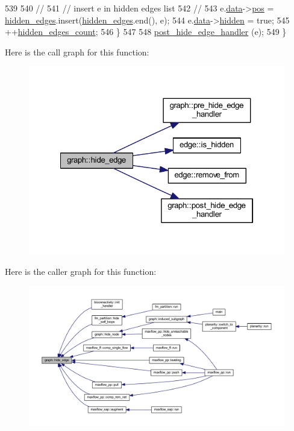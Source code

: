 \begin{DoxyCode}
539 
540     \textcolor{comment}{//}
541     \textcolor{comment}{// insert e in hidden edges list}
542     \textcolor{comment}{//}
543     e.\mbox{\hyperlink{classedge_a0ebb6dfa28b77f47529085049352b436}{data}}->\mbox{\hyperlink{classedge__data_a178a8fd40a6ec8139291f96a7807f711}{pos}} = \mbox{\hyperlink{classgraph_a0d3da33d047ba7cdc3dc68b5d9c84b88}{hidden\_edges}}.insert(\mbox{\hyperlink{classgraph_a0d3da33d047ba7cdc3dc68b5d9c84b88}{hidden\_edges}}.end(), e);
544     e.\mbox{\hyperlink{classedge_a0ebb6dfa28b77f47529085049352b436}{data}}->\mbox{\hyperlink{classedge__data_af8dc68051e5fe3336aa31ae1f3e104c3}{hidden}} = \textcolor{keyword}{true};
545     ++\mbox{\hyperlink{classgraph_a3151f544e049fbd985204ca9d8f74c97}{hidden\_edges\_count}};
546     \}
547 
548     \mbox{\hyperlink{classgraph_ad4614e74a125054eb3e180f6f32ab7bb}{post\_hide\_edge\_handler}} (e);
549 \}
\end{DoxyCode}
Here is the call graph for this function\+:
\nopagebreak
\begin{figure}[H]
\begin{center}
\leavevmode
\includegraphics[width=322pt]{classgraph_ab2f8520bcac080d73c55228fecc61825_cgraph}
\end{center}
\end{figure}
Here is the caller graph for this function\+:
\nopagebreak
\begin{figure}[H]
\begin{center}
\leavevmode
\includegraphics[width=350pt]{classgraph_ab2f8520bcac080d73c55228fecc61825_icgraph}
\end{center}
\end{figure}
\mbox{\label{classgraph_a214618b5e3c02695779350532506e225}} 
